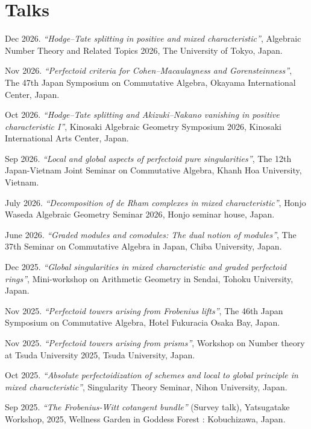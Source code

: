 \documentclass[10pt,a4paper,sans]{moderncv}
\begin{document}
\section{Talks}

\begin{etaremune}
  \item Dec 2026. \emph{``Hodge--Tate splitting in positive and mixed characteristic''}, \textsf{Algebraic Number Theory and Related Topics 2026}, The University of Tokyo, Japan.
  \item Nov 2026. \emph{``Perfectoid criteria for Cohen--Macaulayness and Gorensteinness''}, \textsf{The 47th Japan Symposium on Commutative Algebra}, Okayama International Center, Japan.
  \item Oct 2026. \emph{``Hodge--Tate splitting and Akizuki--Nakano vanishing in positive characteristic I''}, \textsf{Kinosaki Algebraic Geometry Symposium 2026}, Kinosaki International Arts Center, Japan.
  \item Sep 2026. \emph{``Local and global aspects of perfectoid pure singularities''}, \textsf{The 12th Japan-Vietnam Joint Seminar on Commutative Algebra}, Khanh Hoa University, Vietnam.
  \item July 2026. \emph{``Decomposition of de Rham complexes in mixed characteristic''}, \textsf{Honjo Waseda Algebraic Geometry Seminar 2026}, Honjo seminar house, Japan.
  \item June 2026. \emph{``Graded modules and comodules: The dual notion of modules''}, \textsf{The 37th Seminar on Commutative Algebra in Japan}, Chiba University, Japan.
  \item Dec 2025. \emph{``Global singularities in mixed characteristic and graded perfectoid rings''}, \textsf{Mini-workshop on Arithmetic Geometry in Sendai}, Tohoku University, Japan.
  \item Nov 2025. \emph{``Perfectoid towers arising from Frobenius lifts''}, \textsf{The 46th Japan Symposium on Commutative Algebra}, Hotel Fukuracia Osaka Bay, Japan.
  \item Nov 2025. \emph{``Perfectoid towers arising from prisms''}, \textsf{Workshop on Number theory at Tsuda University 2025}, Tsuda University, Japan.
  \item Oct 2025. \emph{``Absolute perfectoidization of schemes and local to global principle in mixed characteristic''}, \textsf{Singularity Theory Seminar}, Nihon University, Japan.
  \item Sep 2025. \emph{``The Frobenius-Witt cotangent bundle''} (Survey talk), \textsf{Yatsugatake Workshop, 2025}, Wellness Garden in Goddess Forest : Kobuchizawa, Japan.

\end{etaremune}
\end{document}
